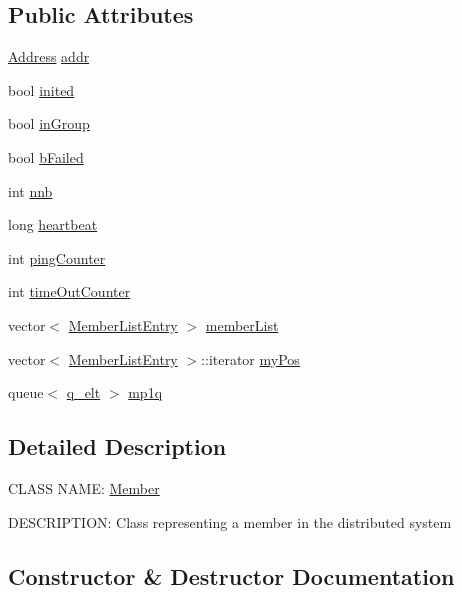 \subsection*{Public Attributes}
\begin{DoxyCompactItemize}
\item 
\hyperlink{class_address}{Address} \hyperlink{class_member_a15255ad694aab6b42313f01d9f1c2b03}{addr}
\item 
bool \hyperlink{class_member_a1c7380a6632aecda712316ca24f3f015}{inited}
\item 
bool \hyperlink{class_member_aaa10136152397774c018ad7775369e55}{in\+Group}
\item 
bool \hyperlink{class_member_adf9e67156c652455a281dfaeed31e4b3}{b\+Failed}
\item 
int \hyperlink{class_member_a74c51884e3d80e38ef3c25e8c111cd9b}{nnb}
\item 
long \hyperlink{class_member_a112370796bf495cafda11827a21682a4}{heartbeat}
\item 
int \hyperlink{class_member_abc5127f9400138b743b8bc437758611a}{ping\+Counter}
\item 
int \hyperlink{class_member_a30c6e44397b58f19f28383e2d454f6ad}{time\+Out\+Counter}
\item 
vector$<$ \hyperlink{class_member_list_entry}{Member\+List\+Entry} $>$ \hyperlink{class_member_a7c3872c420af12628ce50bbc66010842}{member\+List}
\item 
vector$<$ \hyperlink{class_member_list_entry}{Member\+List\+Entry} $>$\+::iterator \hyperlink{class_member_a50bf6051866f7968484600b98d784303}{my\+Pos}
\item 
queue$<$ \hyperlink{classq__elt}{q\+\_\+elt} $>$ \hyperlink{class_member_a62f45dfeaee8e141c328149f6c36efe2}{mp1q}
\end{DoxyCompactItemize}


\subsection{Detailed Description}
C\+L\+A\+S\+S N\+A\+M\+E\+: \hyperlink{class_member}{Member}

D\+E\+S\+C\+R\+I\+P\+T\+I\+O\+N\+: Class representing a member in the distributed system 

\subsection{Constructor \& Destructor Documentation}
\hypertarget{class_member_a44241aa6aa9b792b550d9cc29e7ad050}{}
